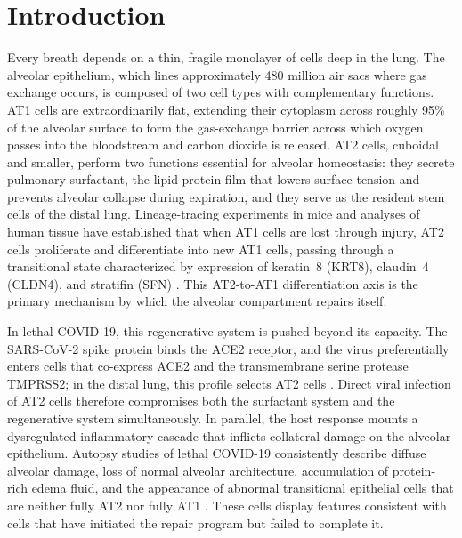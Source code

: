 \documentclass[11pt]{article}
\begin{document}
\section{Introduction}

Every breath depends on a thin, fragile monolayer of cells deep in the lung. The alveolar epithelium, which lines approximately 480 million air sacs where gas exchange occurs, is composed of two cell types with complementary functions. AT1 cells are extraordinarily flat, extending their cytoplasm across roughly 95\% of the alveolar surface to form the gas-exchange barrier across which oxygen passes into the bloodstream and carbon dioxide is released. AT2 cells, cuboidal and smaller, perform two functions essential for alveolar homeostasis: they secrete pulmonary surfactant, the lipid-protein film that lowers surface tension and prevents alveolar collapse during expiration, and they serve as the resident stem cells of the distal lung. Lineage-tracing experiments in mice and analyses of human tissue have established that when AT1 cells are lost through injury, AT2 cells proliferate and differentiate into new AT1 cells, passing through a transitional state characterized by expression of keratin~8 (KRT8), claudin~4 (CLDN4), and stratifin (SFN) \citep{Barkauskas2013, Kobayashi2020, Strunz2020}. This AT2-to-AT1 differentiation axis is the primary mechanism by which the alveolar compartment repairs itself.

In lethal COVID-19, this regenerative system is pushed beyond its capacity. The SARS-CoV-2 spike protein binds the ACE2 receptor, and the virus preferentially enters cells that co-express ACE2 and the transmembrane serine protease TMPRSS2; in the distal lung, this profile selects AT2 cells \citep{Ziegler2020, Hou2020}. Direct viral infection of AT2 cells therefore compromises both the surfactant system and the regenerative system simultaneously. In parallel, the host response mounts a dysregulated inflammatory cascade that inflicts collateral damage on the alveolar epithelium. Autopsy studies of lethal COVID-19 consistently describe diffuse alveolar damage, loss of normal alveolar architecture, accumulation of protein-rich edema fluid, and the appearance of abnormal transitional epithelial cells that are neither fully AT2 nor fully AT1 \citep{Borczuk2020, Melms2021}. These cells display features consistent with cells that have initiated the repair program but failed to complete it.
\end{document}
